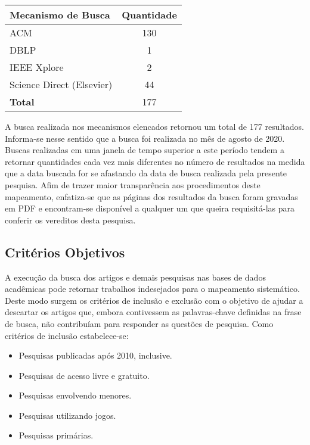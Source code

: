 \documentclass[12pt]{article}
\begin{document}
{\centering
{}\label{tab:numero}
\begin{tabular}{l*{1}c}
\textbf{Mecanismo de Busca}              & \textbf{Quantidade} \\
\hline
ACM  & 130   \\
DBLP            & 1   \\
IEEE Xplore           & 2   \\
Science Direct (Elsevier)    & 44   \\
\hline
\textbf{Total}           & 177
\end{tabular}\par
}

A busca realizada nos mecanismos elencados retornou um total de 177 resultados. Informa-se nesse sentido que a busca foi realizada no mês de agosto de 2020. Buscas realizadas em uma janela de tempo superior a este período tendem a retornar quantidades cada vez mais diferentes no número de resultados na medida que a data buscada for se afastando da data de busca realizada pela presente pesquisa. Afim de trazer maior transparência aos procedimentos deste mapeamento, enfatiza-se que as páginas dos resultados da busca foram gravadas em PDF e encontram-se disponível a qualquer um que queira requisitá-las para conferir os vereditos desta pesquisa. 



\subsection{Critérios Objetivos}\label{a:3}

A execução da busca dos artigos e demais pesquisas nas bases de dados acadêmicas pode retornar trabalhos indesejados para o mapeamento sistemático. Deste modo surgem os critérios de inclusão e exclusão com o objetivo de ajudar a descartar os artigos que, embora contivessem as palavras-chave definidas na frase de busca, não contribuíam para responder as questões de pesquisa. Como critérios de inclusão estabelece-se:

\begin{itemize}
    \item Pesquisas publicadas após 2010, inclusive.
    \item Pesquisas de acesso livre e gratuito.
    \item Pesquisas envolvendo menores.
    \item Pesquisas utilizando jogos.
    \item Pesquisas primárias.
\end{itemize}
\end{document}
